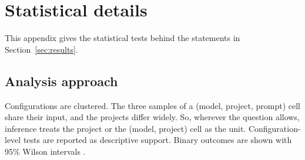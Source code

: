 \section{Statistical details}\label{app:stats}

This appendix gives the statistical tests behind the statements in Section~\ref{sec:results}.

\subsection{Analysis approach}

Configurations are clustered. The three samples of a (model, project, prompt) cell share their input, and the projects differ widely. So, wherever the question allows, inference treats the project or the (model, project) cell as the unit. Configuration-level tests are reported as descriptive support. Binary outcomes are shown with 95\% Wilson intervals \citep{wilson1927probable}.

